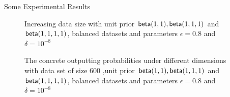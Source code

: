 \documentclass[final,hyperref={pdfpagelabels=false}]{beamer}
\begin{document}
\begin{frame}[t]
\begin{columns}[t]
\begin{column}{.485\textwidth} %






\begin{block}{Some Experimental Results}
\begin{figure}[H]
\begin{center}
\centering
  \caption{Increasing data size with unit prior $\mathsf{beta}(1,1), \mathsf{beta}(1,1,1)$ and $\mathsf{beta}(1,1,1,1)$, balanced datasets and parameters $\epsilon = 0.8$ and $\delta = 10^{-8}$}
\label{fig_vs_datasize}
\end{center}
\end{figure}

\begin{figure}[H]
\begin{center}
\centering
\caption{The concrete outputting probabilities under different dimensions with data set of size $600$ ,unit prior $\mathsf{beta}(1,1), \mathsf{beta}(1,1,1)$ and $\mathsf{beta}(1,1,1,1)$, balanced datasets and parameters $\epsilon = 0.8$ and $\delta = 10^{-8}$}
\label{fig_vs_datasize}
\end{center}
\end{figure}


\end{block}
\end{column}
\end{columns}
\end{frame}
\end{document}
